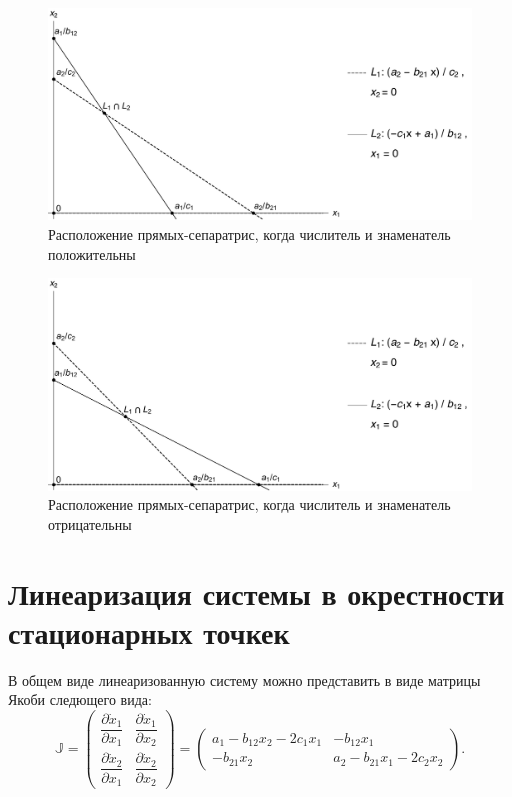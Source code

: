 \documentclass[12pt,a4paper]{article}
\begin{document}
    \begin{figure}
        \centering
        \includegraphics[width=\textwidth]{sep_1.pdf}
        \caption{Расположение прямых-сепаратрис, когда числитель и знаменатель положительны}
        \label{fig:sep_1}
    \end{figure}

    \begin{figure}
        \centering
        \includegraphics[width=\textwidth]{sep_2.pdf}
        \caption{Расположение прямых-сепаратрис, когда числитель и знаменатель отрицательны}
        \label{fig:sep_2}
    \end{figure}

    \pagebreak

    \section{Линеаризация системы в окрестности стационарных точкек}
    В общем виде линеаризованную систему можно представить в виде матрицы Якоби следющего вида: 
    \begin{equation}
        \label{jacobian}
        \mathbb{J} = 
            \begin{pmatrix}
                \dfrac{\partial{\dot x_1}}{\partial x_1}
                &
                \dfrac{\partial{\dot x_1}}{\partial x_2}
                \\[5mm]
                \dfrac{\partial{\dot x_2}}{\partial x_1}
                &
                \dfrac{\partial{\dot x_2}}{\partial x_2}
            \end{pmatrix}
        =
            \begin{pmatrix}
                a_1 - b_{12} x_2 - 2 c_1 x_1 & -b_{12} x_1
                \\
                -b_{21} x_2 & a_2 - b_{21} x_1 - 2c_2 x_2
            \end{pmatrix}\!.
    \end{equation}
\end{document}

